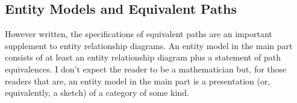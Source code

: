 \subsection{Entity Models and Equivalent Paths}
\mynote
However written,  the specifications of equivalent paths are
an important supplement to entity relationship diagrams. 
An entity model in the main part consists of at least an entity relationship diagram  
plus a statement of path equivalences.
\mynote
I don't expect the reader to be a mathematician but, for those readers that are, an entity model in the main part is a presentation 
(or, equivalently, a sketch) of a category of some kind. 